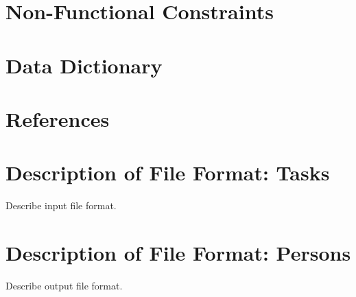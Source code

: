 \section{Non-Functional Constraints}

\section{Data Dictionary}

\section{References}

\appendix

\section{Description of File Format: Tasks}

Describe input file format.

\section{Description of File Format: Persons}

Describe output file format.


